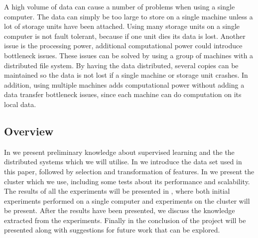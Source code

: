 A high volume of data can cause a number of problems when using a single computer. The data can simply be too large to store on a single machine unless a lot of storage units have been attached. Using many storage units on a single computer is not fault tolerant, because if one unit dies its data is lost. Another issue is the processing power, additional computational power could introduce bottleneck issues. These issues can be solved by using a group of machines with a distributed file system. By having the data distributed, several copies can be maintained so the data is not lost if a single machine or storage unit crashes. In addition, using multiple machines adds computational power without adding a data transfer bottleneck issues, since each machine can do computation on its local data.

\subsection{Overview}\label{sec:overview}
In  we present preliminary knowledge about supervised learning and the the distributed systems which we will utilise. In  we introduce the data set used in this paper, followed by selection and transformation of features. In  we present the cluster which we use, including some tests about its performance and scalability. The results of all the experiments will be presented in , where both initial experiments performed on a single computer and experiments on the cluster will be present. After the results have been presented, we discuss the knowledge extracted from the experiments. Finally in  the conclusion of the project will be presented along with suggestions for future work that can be explored.